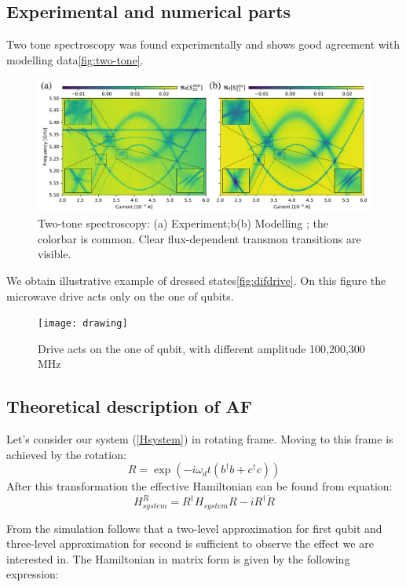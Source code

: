 \documentclass[%
 aip,
 amsmath,amssymb,
 reprint,%
]{revtex4-1}
\begin{document}
\subsection{\label{sec:level1} Experimental and numerical parts}
Two tone spectroscopy was found experimentally and shows good agreement with modelling data\autoref{fig:two-tone}. 
\begin{figure}[h]
	\centering
	\includegraphics[width=\linewidth]{main_picture}
	\caption{Two-tone spectroscopy: (a) Experiment;b(b) Modelling ; the colorbar is common.  Clear flux-dependent transmon transitions are visible.}
	\label{fig:two-tone}
\end{figure}

We obtain illustrative example of dressed states\autoref{fig:difdrive}. On this figure the microwave drive acts only on the one of qubits. 
\begin{figure}[h]
	\centering
	\texttt{[image: drawing]}
	\caption{Drive acts on the one of qubit, with different amplitude 100,200,300 MHz}
	\label{fig:difdrive}
\end{figure}


\subsection{Theoretical description of AF}
Let's consider our system (\autoref{Hsystem}) in rotating frame. Moving to this frame is achieved by the rotation:
\begin{equation}
R = \exp(-i\omega_d t (b^{\dagger}b+c^{\dagger}c))
\end{equation}  
After this transformation the effective Hamiltonian can be found from equation:
\begin{equation}
H_{system}^R = R^{\dagger}H_{system}R-iR^{\dagger}\dot{R}
\end{equation}

From the simulation follows that a two-level approximation for first qubit and three-level approximation for second is sufficient to observe the effect we are interested in. The Hamiltonian in matrix form is given by the following expression:
\end{document}

